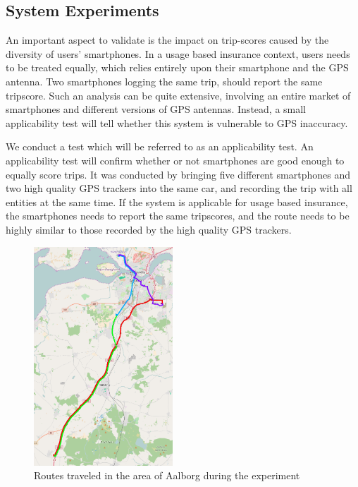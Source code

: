 \subsection{System Experiments}\label{subsec:expsystem}
An important aspect to validate is the impact on trip-scores caused by the diversity of users' smartphones. In a usage based insurance context, users needs to be treated equally, which relies entirely upon their smartphone and the GPS antenna. Two smartphones logging the same trip, should report the same tripscore. Such an analysis can be quite extensive, involving an entire market of smartphones and different versions of GPS antennas. Instead, a small applicability test will tell whether this system is vulnerable to GPS inaccuracy. 

We conduct a test which will be referred to as an applicability test. An applicability test will confirm whether or not smartphones are good enough to equally score trips. It was conducted by bringing five different smartphones and two high quality GPS trackers into the same car, and recording the trip with all entities at the same time. If the system is applicable for usage based insurance, the smartphones needs to report the same tripscores, and the route needs to be highly similar to those recorded by the high quality GPS trackers.
 
\begin{figure}[tb]
\centering
\includegraphics[width=0.465\textwidth]{Pictures/experiment_routes}
\caption{Routes traveled in the area of Aalborg during the experiment}
\label{fig:experiment_routes}
\end{figure}

